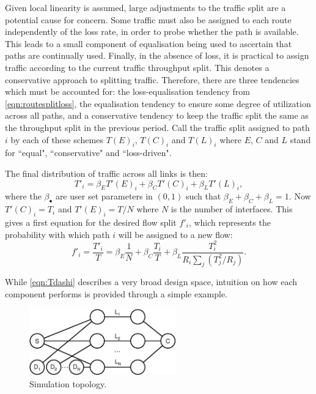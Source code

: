Given local linearity is assumed, large adjustments to the traffic split are a potential cause for concern.
Some traffic must also be assigned to each route independently of the loss rate, in order to probe whether the path is available.
This leads to a small component of equalisation being used to ascertain that paths are continually used.
Finally, in the absence of loss, it is practical to assign traffic according to the current traffic throughput split.  
This denotes a conservative approach to splitting traffic.
Therefore, there are three tendencies which must be accounted for: the loss-equalisation tendency from \eqref{eqn:routesplitloss}, the equalisation tendency to ensure some degree of utilization across all paths, and a conservative tendency to keep the traffic split the same as the throughput split in the previous period.
Call the traffic split assigned to path $i$  by each of these schemes $T(E)_i$, $T(C)_i$ and $T(L)_i$ where $E$, $C$ and $L$ stand for ``equal", ``conservative" and ``loss-driven".

The final distribution of traffic across all links is then:
$$
T'_i = \beta_E T'(E)_i + \beta_C T'(C)_i + \beta_L T'(L)_i,
$$
where the $\beta_\bullet$ are user set parameters in $(0,1)$ such that $\beta_E+\beta_C + \beta_L = 1$.  Now $T'(C)_i = T_i$ and $T'(E)_i = T/N$ where $N$ is the number of interfaces. 
This gives a first equation for the desired flow split $f'_i$, which represents the probability with which path $i$ will be assigned to a new flow:
\begin{equation}
f'_i = \frac{T'_i}{T} =  \beta_E \frac{1}{N} + \beta_C \frac{T_i}{T} +
\beta_L \frac{T_i^2}{R_i \sum_j (T_j^2/R_j)}.
\label{eqn:Tdashi}
\end{equation}


While \eqref{eqn:Tdashi} describes a very broad design space, intuition on how each component performs is provided through a simple example.

\begin{figure}
    \centering
    \includegraphics[width=2.5in]{figures/cate/topo}
    \caption{Simulation topology.}
    \label{fig:topo}
\end{figure}


